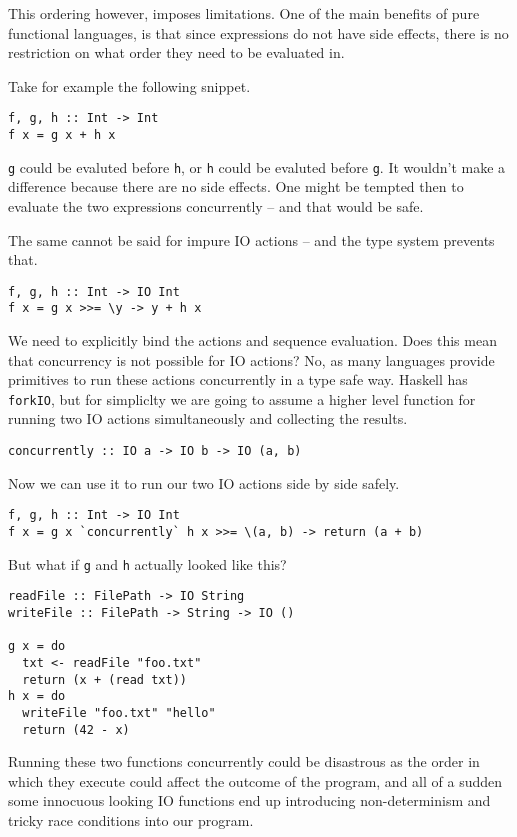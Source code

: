 \documentclass{report}
\begin{document}
This ordering however, imposes limitations. One of the main benefits of pure
functional languages, is that since expressions do not have side effects, there
is no restriction on what order they need to be evaluated in.

Take for example the following snippet.
\begin{verbatim}
f, g, h :: Int -> Int
f x = g x + h x
\end{verbatim}

\texttt{g} could be evaluted before \texttt{h}, or \texttt{h} could
be evaluted before \texttt{g}. It wouldn't make a difference because there
are no side effects. One might be tempted then to evaluate the two expressions
concurrently -- and that would be safe.

The same cannot be said for impure IO actions -- and the type system prevents that.
\begin{verbatim}
f, g, h :: Int -> IO Int
f x = g x >>= \y -> y + h x
\end{verbatim}
We need to explicitly bind the actions and sequence evaluation.
Does this mean that concurrency is not possible for IO actions? No, as many
languages provide primitives to run these actions concurrently in a type safe
way. Haskell has \texttt{forkIO}, but for simpliclty we are going
to assume a higher level function for running two IO actions simultaneously and
collecting the results.

\begin{verbatim}
concurrently :: IO a -> IO b -> IO (a, b)
\end{verbatim}

Now we can use it to run our two IO actions side by side safely. 
\begin{verbatim}
f, g, h :: Int -> IO Int
f x = g x `concurrently` h x >>= \(a, b) -> return (a + b)
\end{verbatim}

But what if \texttt{g} and \texttt{h} actually looked like this?

\begin{verbatim}
readFile :: FilePath -> IO String
writeFile :: FilePath -> String -> IO ()

g x = do
  txt <- readFile "foo.txt"
  return (x + (read txt))
h x = do
  writeFile "foo.txt" "hello"
  return (42 - x)
\end{verbatim}

Running these two functions concurrently could be disastrous as the order in
which they execute could affect the outcome of the program, and all of a sudden
some innocuous looking IO functions end up introducing non-determinism and
tricky race conditions into our program.
\end{document}
